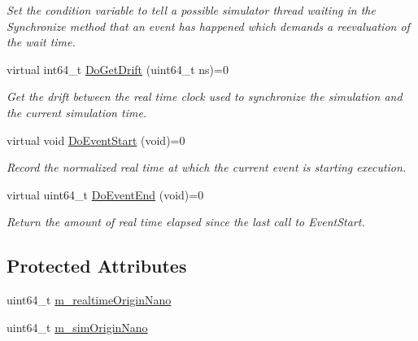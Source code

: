 \begin{DoxyCompactItemize}
\begin{DoxyCompactList}\small\item\em Set the condition variable to tell a possible simulator thread waiting in the Synchronize method that an event has happened which demands a reevaluation of the wait time. \end{DoxyCompactList}\item 
virtual int64\+\_\+t \hyperlink{classns3_1_1Synchronizer_a932323ccabc78704ecf4f9846863b5d8}{Do\+Get\+Drift} (uint64\+\_\+t ns)=0
\begin{DoxyCompactList}\small\item\em Get the drift between the real time clock used to synchronize the simulation and the current simulation time. \end{DoxyCompactList}\item 
virtual void \hyperlink{classns3_1_1Synchronizer_aeecd7590ac6320fdc346eb1d1fee85c3}{Do\+Event\+Start} (void)=0
\begin{DoxyCompactList}\small\item\em Record the normalized real time at which the current event is starting execution. \end{DoxyCompactList}\item 
virtual uint64\+\_\+t \hyperlink{classns3_1_1Synchronizer_a2c5aa545296acd0e5e4c5ccdbce8b834}{Do\+Event\+End} (void)=0
\begin{DoxyCompactList}\small\item\em Return the amount of real time elapsed since the last call to Event\+Start. \end{DoxyCompactList}\end{DoxyCompactItemize}
\subsection*{Protected Attributes}
\begin{DoxyCompactItemize}
\item 
uint64\+\_\+t \hyperlink{classns3_1_1Synchronizer_a8156cd6893af54e80108f5630c63c2ab}{m\+\_\+realtime\+Origin\+Nano}
\item 
uint64\+\_\+t \hyperlink{classns3_1_1Synchronizer_ad942aa4d448de68f9c3ca022ba6408b5}{m\+\_\+sim\+Origin\+Nano}
\end{DoxyCompactItemize}
